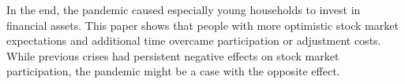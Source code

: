 \documentclass[ProjectABM]{subfiles}
\begin{document}
In the end, the pandemic caused especially young households to invest in financial assets. This paper shows that people with more optimistic stock market expectations and additional time overcame participation or adjustment costs. While previous crises had persistent negative effects on stock market participation, the pandemic might be a case with the opposite effect.%



\onlyinsubfile{}
%
\end{document}
